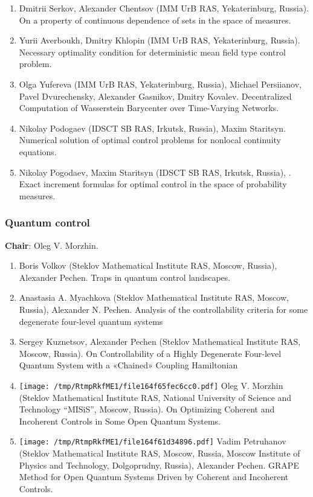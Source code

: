 \documentclass[
]{article}
\providecommand{\tightlist}{%
  \setlength{\itemsep}{0pt}\setlength{\parskip}{0pt}}
\begin{document}
\begin{enumerate}
\def\labelenumi{\arabic{enumi}.}
\tightlist
\item
  Dmitrii Serkov, Alexander Chentsov (IMM UrB RAS, Yekaterinburg,
  Russia). On a property of continuous dependence of sets in the space
  of measures.
\item
  Yurii Averboukh, Dmitry Khlopin (IMM UrB RAS, Yekaterinburg, Russia).
  Necessary optimality condition for deterministic mean field type
  control problem.
\item
  Olga Yufereva (IMM UrB RAS, Yekaterinburg, Russia), Michael
  Persiianov, Pavel Dvurechensky, Alexander Gasnikov, Dmitry Kovalev.
  Decentralized Computation of Wasserstein Barycenter over Time-Varying
  Networks.
\item
  Nikolay Podogaev (IDSCT SB RAS, Irkutsk, Russia), Maxim Staritsyn.
  Numerical solution of optimal control problems for nonlocal continuity
  equations.
\item
  Nikolay Pogodaev, Maxim Staritsyn (IDSCT SB RAS, Irkutsk, Russia),
  . Exact increment formulas
  for optimal control in the space of probability measures.
\end{enumerate}

\hypertarget{qc}{%
\subsubsection{Quantum control}\label{qc}}

\textbf{Chair}: Oleg V. Morzhin.

\begin{enumerate}
\def\labelenumi{\arabic{enumi}.}
\tightlist
\item
  Boris Volkov (Steklov Mathematical Institute RAS, Moscow, Russia),
  Alexander Pechen. Traps in quantum control landscapes.
\item
  Anastasia A. Myachkova (Steklov Mathematical Institute RAS, Moscow,
  Russia), Alexander N. Pechen. Analysis of the controllability criteria
  for some degenerate four-level quantum systems
\item
  Sergey Kuznetsov, Alexander Pechen (Steklov Mathematical Institute
  RAS, Moscow, Russia). On Controllability of a Highly Degenerate
  Four-level Quantum System with a «Chained» Coupling Hamiltonian
\item
  \protect\texttt{[image: /tmp/RtmpRkfME1/file164f65fec6cc0.pdf]}
  Oleg V. Morzhin (Steklov Mathematical Institute RAS, National
  University of Science and Technology ``MISiS'', Moscow, Russia). On
  Optimizing Coherent and Incoherent Controls in Some Open Quantum
  Systems.
\item
  \protect\texttt{[image: /tmp/RtmpRkfME1/file164f61d34896.pdf]}
  Vadim Petruhanov (Steklov Mathematical Institute RAS, Moscow, Russia,
  Moscow Institute of Physics and Technology, Dolgoprudny, Russia),
  Alexander Pechen. GRAPE Method for Open Quantum Systems Driven by
  Coherent and Incoherent Controls.
\end{enumerate}
\end{document}
